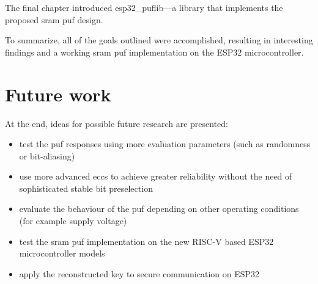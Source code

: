 The final chapter introduced esp32\_puflib---a library that implements the proposed \gls{sram} \gls{puf} design.

To summarize, all of the goals outlined were accomplished, resulting in interesting findings and a working \gls{sram} \gls{puf} implementation on the ESP32 microcontroller.

\newpage

\section*{Future work}
{}

At the end, ideas for possible future research are presented:
\begin{itemize}
    \item test the \gls{puf} responses using more evaluation parameters (such as randomness or bit-aliasing)
    \item use more advanced \glspl{ecc} to achieve greater reliability without the need of sophisticated stable bit preselection
    \item evaluate the behaviour of the \gls{puf} depending on other operating conditions (for example supply voltage)
    \item test the \gls{sram} \gls{puf} implementation on the new RISC-V based ESP32 microcontroller models
    \item apply the reconstructed key to secure communication on ESP32
\end{itemize}

